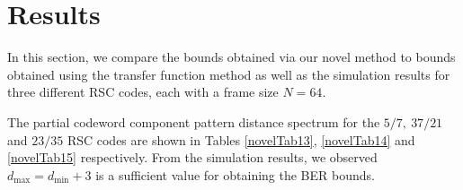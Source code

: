 \section{Results}
\label{sec5}
In this section, we compare the bounds obtained via our novel method to bounds obtained using the transfer function method as well as the simulation results for three different RSC codes, each with a frame size $N=64$. 

The partial codeword component pattern distance spectrum for the $5/7,~37/21$ and $23/35$ RSC codes are shown in Tables \ref{novelTab13},  \ref{novelTab14} and \ref{novelTab15} respectively. 
From the simulation results, we observed $d_{\text{max}}=d_{\text{min}}+3$ is a sufficient value for obtaining the BER bounds.

